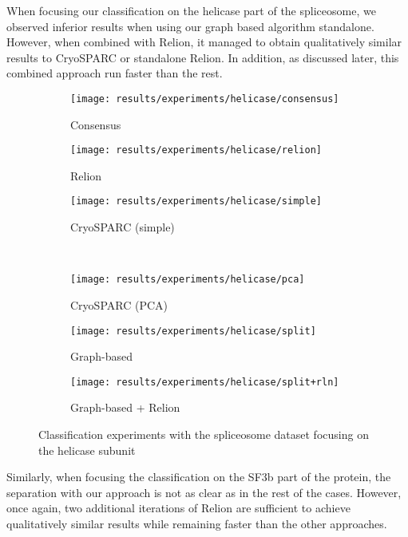 \documentclass[../main.tex]{subfiles}
\begin{document}
When focusing our classification on the helicase part of the spliceosome, we observed inferior results when using our graph based algorithm standalone. However, when combined with Relion, it managed to obtain qualitatively similar results to CryoSPARC or standalone Relion. In addition, as discussed later, this combined approach run faster than the rest. 

\begin{figure}[hbp]
    \centering
    \begin{subfigure}[b]{0.3\textwidth}
         \centering
         \texttt{[image: results/experiments/helicase/consensus]}
         \caption{Consensus}
    \end{subfigure}
    \begin{subfigure}[b]{0.3\textwidth}
         \centering
         \texttt{[image: results/experiments/helicase/relion]}
         \caption{Relion}
    \end{subfigure}
    \begin{subfigure}[b]{0.3\textwidth}
         \centering
         \texttt{[image: results/experiments/helicase/simple]}
         \caption{CryoSPARC (simple)}
    \end{subfigure}\\
    \vspace{1em}
    \begin{subfigure}[b]{0.3\textwidth}
         \centering
         \texttt{[image: results/experiments/helicase/pca]}
         \caption{CryoSPARC (PCA)}
    \end{subfigure}
    \begin{subfigure}[b]{0.3\textwidth}
         \centering
         \texttt{[image: results/experiments/helicase/split]}
         \caption{Graph-based}
    \end{subfigure}
    \begin{subfigure}[b]{0.3\textwidth}
         \centering
         \texttt{[image: results/experiments/helicase/split+rln]}
         \caption{Graph-based + Relion}
    \end{subfigure}
    \caption{Classification experiments with the spliceosome dataset focusing on the helicase subunit}
    \label{fig:5.2:helicase_slices}
\end{figure}

Similarly, when focusing the classification on the SF3b part of the protein, the separation with our approach is not as clear as in the rest of the cases. However, once again, two additional iterations of Relion are sufficient to achieve qualitatively similar results while remaining faster than the other approaches. 
\end{document}
